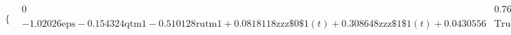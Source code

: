 \begin{gather*}
   \begin{array}{cc}
    \{ & 
   \begin{array}{cc}
    0 & 0.767742 \text{eps}+0.116129 \text{qtm1}+0.383871 \text{rutm1}-0.0615634
      \text{zzz$\$$0$\$$1}(t)-0.232258 \text{zzz$\$$1$\$$1}(t)\geq 0.0323994 \\
    -1.02026 \text{eps}-0.154324 \text{qtm1}-0.510128 \text{rutm1}+0.0818118
      \text{zzz$\$$0$\$$1}(t)+0.308648 \text{zzz$\$$1$\$$1}(t)+0.0430556 &
      \text{True} \\
   \end{array}
    \\
   \end{array}
\end{gather*}

